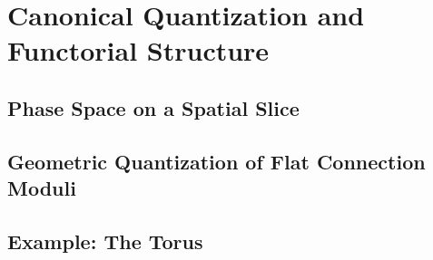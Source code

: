%
%
%

\section{Canonical Quantization and Functorial Structure}


\subsection{Phase Space on a Spatial Slice}


\subsection{Geometric Quantization of Flat Connection Moduli}


\subsection{Example: The Torus}

